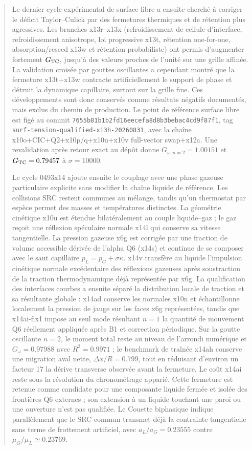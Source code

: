 \documentclass[11pt,a4paper]{article}
\begin{document}
\begin{abstract}
Le dernier cycle expérimental de surface libre a ensuite cherché à corriger le déficit Taylor--Culick par des fermetures thermiques et de rétention plus agressives. Les branches x13r--x13x (refroidissement de cellule d'interface, refroidissement anisotrope, loi progressive x13t, rétention one-for-one, absorption/reseed x13w et rétention probabiliste) ont permis d'augmenter fortement $G_{\rm TC}$, jusqu'à des valeurs proches de l'unité sur une grille affinée. La validation croisée par gouttes oscillantes a cependant montré que la fermeture x13t+x13w contracte artificiellement le support de phase et détruit la dynamique capillaire, surtout sur la grille fine. Ces développements sont donc conservés comme résultats négatifs documentés, mais exclus du chemin de production. Le point de référence surface libre est figé au commit \texttt{7655b81b1b2fd16eecefa8d8b3bebac4cd9f87f1}, tag \texttt{surf-tension-qualified-x13h-20260831}, avec la chaîne x10o+CIC+Q2+x10p/q+x10u+x10v full-vector swap+x12a. Une revalidation après retour exact au dépôt donne $G_{\omega,n=2}=1.00151$ et $G_{\rm TC}=0.79457$ à $\sigma=10000$.


Le cycle 0493x14 ajoute ensuite le couplage avec une phase gazeuse particulaire explicite sans modifier la chaîne liquide de référence. Les collisions SRC restent communes au mélange, tandis qu'un thermostat par espèce permet des masses et températures distinctes. La géométrie cinétique x10u est étendue bilatéralement au couple liquide--gaz ; le gaz reçoit une réflexion spéculaire normale x14l qui conserve sa vitesse tangentielle. La pression gazeuse x6g est corrigée par une fraction de volume accessible dérivée de l'alpha Q6 (x14s) et continue de se composer avec le saut capillaire $p_L=p_G+\sigma\kappa$. x14v transfère au liquide l'impulsion cinétique normale excédentaire des réflexions gazeuses après soustraction de la traction thermodynamique déjà représentée par x6g. La qualification des interfaces courbes a ensuite séparé la distribution locale de traction et sa résultante globale : x14ad conserve les normales x10n et échantillonne localement la pression de jauge sur les faces x6g représentées, tandis que x14ai-fix1 impose au seul mode résultant $n=1$ la quantité de mouvement Q6 réellement appliquée après B1 et correction périodique. Sur la goutte oscillante $n=2$, le moment total reste au niveau de l'arrondi numérique et $G_\omega=0.97988$ avec $R^2=0.9971$ ; le benchmark de traînée x14ah conserve une migration aval nette, $\Delta x/R=0.799$, tout en réduisant d'environ un facteur 17 la dérive transverse observée avant la fermeture. Le coût x14ai reste sous la résolution du chronométrage apparié. Cette fermeture est retenue comme candidate pour une composante liquide fermée et isolée des frontières Q6 externes ; son extension à un liquide touchant une paroi ou une ouverture n'est pas qualifiée. Le Couette biphasique indique parallèlement que le SRC commun transmet déjà la contrainte tangentielle sans terme de frottement artificiel, avec $a_L/a_G=0.23555$ contre $\mu_G/\mu_L\simeq0.23769$.

\end{abstract}
\end{document}
